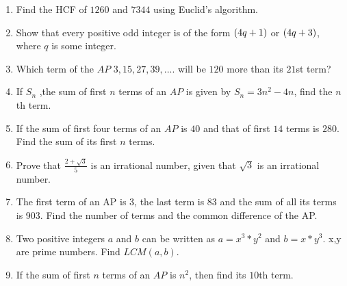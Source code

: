 \begin{enumerate}
\item Find the HCF of $1260$ and $7344$ using Euclid's algorithm.
\item Show that every positive odd integer is of the form $\left(4q+1\right)$ or $\left(4q+3\right)$, where $q$ is some integer.
\item Which term of the $AP$ $3, 15, 27, 39, ....$ will be $120$ more than its $21$st term?
\item If $S_n$ ,the sum of first $n$ terms of an $AP$ is given by $S_n=3n^2-4n$, find the $n$th term.
\item If the sum of first four terms of an $AP$ is $40$ and that of first $14$ terms is $280$. Find the sum of its first $n$ terms.
\item Prove that $\frac{2+\sqrt{3}}{5}$  is an irrational number, given that $\sqrt{3}$ is an irrational number.
\item The first term of an AP is 3, the last term is 83 and the sum of all its terms is 903. Find the number of terms and the common difference of the AP.
\item Two positive integers $a$ and $b$ can be written as $a = x^3*y^2$ and $b = x*y^3$. x,y are prime numbers. Find $LCM (a, b)$.
\item If the sum of first $n$ terms of an $AP$ is $n^2$, then find its $10$th term.
\end{enumerate}


